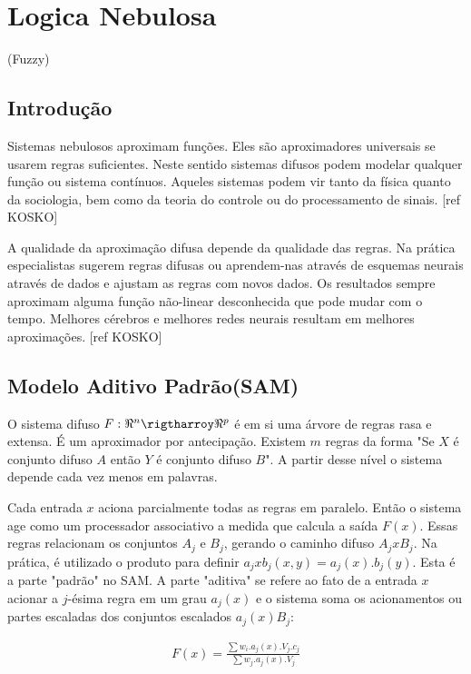 \section{Logica Nebulosa} (Fuzzy)

\subsection{Introdução}

Sistemas nebulosos aproximam funções. Eles são aproximadores universais se usarem regras suficientes. 
Neste sentido sistemas difusos podem modelar qualquer função ou sistema contínuos. Aqueles sistemas podem 
vir tanto da física quanto da sociologia, bem como da teoria do controle ou do processamento de sinais.
[ref KOSKO]

A qualidade da aproximação difusa depende da qualidade das regras. Na prática especialistas sugerem regras
difusas ou aprendem-nas através de esquemas neurais através de dados e ajustam as regras com novos dados.
Os resultados sempre aproximam alguma função não-linear desconhecida que pode mudar com o tempo. Melhores 
cérebros e melhores redes neurais resultam em melhores aproximações. [ref KOSKO]

\subsection{Modelo Aditivo Padrão(SAM)}

O sistema difuso $F:\Re^n \rigtharroy \Re^p$ é em si uma árvore de regras rasa e extensa. É um aproximador
por antecipação. Existem $m$ regras da forma "Se $X$ é conjunto difuso $A$ então $Y$ é conjunto difuso $B$".
A partir desse nível o sistema depende cada vez menos em palavras. 

Cada entrada $x$ aciona parcialmente todas as regras em paralelo. Então o sistema age como um processador 
associativo a medida que calcula a saída
$F(x)$. 
Essas regras relacionam os conjuntos $A_j$ e $B_j$, gerando o caminho difuso $A_j x B_j$. Na prática,
é utilizado o produto para definir $ a_j x b_j (x,y) = a_j(x).b_j(y)$. Esta é a parte "padrão" no SAM.
A parte "aditiva" se refere ao fato de a entrada $x$ acionar a $j$-ésima regra em um grau $a_j(x)$ e o sistema 
soma os acionamentos ou partes escaladas dos conjuntos escalados $a_j(x)B_j$:

\begin{eqnarray}
F(x) = \frac{\sum w_i.a_j(x).V_j.c_j}{\sum w_j.a_j(x).V_j}
\end{eqnarray}

